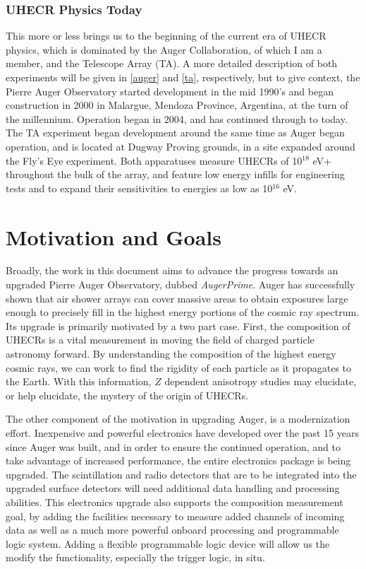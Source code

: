 \subsubsection*{UHECR Physics Today}

This more or less brings us to the beginning of the current era of UHECR physics, which is dominated by the Auger Collaboration, of which I am a member, and the Telescope Array (TA). A more detailed description of both experiments will be given in \autoref{auger} and \autoref{ta}, respectively, but to give context, the Pierre Auger Observatory started development in the mid 1990's and began construction in 2000 in Malargue, Mendoza Province, Argentina, at the turn of the millennium. Operation began in 2004, and has continued through to today. The TA experiment began development around the same time as Auger began operation, and is located at Dugway Proving grounds, in a site expanded around the Fly's Eye experiment. Both apparatuses measure UHECRs of 10$^{18}$ eV+ throughout the bulk of the array, and feature low energy infills for engineering tests and to expand their sensitivities to energies as low as 10$^{16}$ eV.

\section{Motivation and Goals}
Broadly, the work in this document aims to advance the progress towards an upgraded Pierre Auger Observatory, dubbed \textit{AugerPrime}. Auger has successfully shown that air shower arrays can cover massive areas to obtain exposures large enough to precisely fill in the highest energy portions of the cosmic ray spectrum. Its upgrade is primarily motivated by a two part case. First, the composition of UHECRs is a vital measurement in moving the field of charged particle astronomy forward. By understanding the composition of the highest energy cosmic rays, we can work to find the rigidity of each particle as it propagates to the Earth. With this information, $Z$ dependent anisotropy studies may elucidate, or help elucidate, the mystery of the origin of UHECRs.

The other component of the motivation in upgrading Auger, is a modernization effort. Inexpensive and powerful electronics have developed over the past 15 years since Auger was built, and in order to ensure the continued operation, and to take advantage of increased performance, the entire electronics package is being upgraded. The scintillation and radio detectors that are to be integrated into the upgraded surface detectors will need additional data handling and processing abilities. This electronics upgrade also supports the composition measurement goal, by adding the facilities necessary to measure added channels of incoming data as well as a much more powerful onboard processing and programmable logic system. Adding a flexible programmable logic device will allow us the modify the functionality, especially the trigger logic, in situ. 

